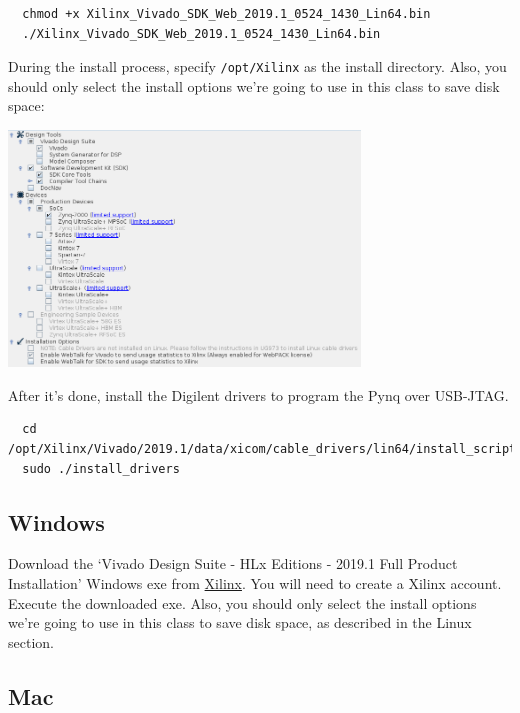 \documentclass[11pt]{article}
\begin{document}
\begin{verbatim}
  chmod +x Xilinx_Vivado_SDK_Web_2019.1_0524_1430_Lin64.bin
  ./Xilinx_Vivado_SDK_Web_2019.1_0524_1430_Lin64.bin
\end{verbatim}

During the install process, specify \texttt{/opt/Xilinx} as the install directory.
Also, you should only select the install options we're going to use in this class to save disk space:

\begin{center}
\includegraphics[width=0.7\textwidth]{figs/vivado_install_options.png}
\end{center}

After it's done, install the Digilent drivers to program the Pynq over USB-JTAG.
\begin{verbatim}
  cd /opt/Xilinx/Vivado/2019.1/data/xicom/cable_drivers/lin64/install_script/install_drivers
  sudo ./install_drivers
\end{verbatim}

\subsection{Windows}
Download the `Vivado Design Suite - HLx Editions - 2019.1  Full Product Installation' Windows exe from \href{https://www.xilinx.com/support/download.html}{Xilinx}.
You will need to create a Xilinx account.
Execute the downloaded exe.
Also, you should only select the install options we're going to use in this class to save disk space, as described in the Linux section.

\subsection{Mac}
\end{document}
